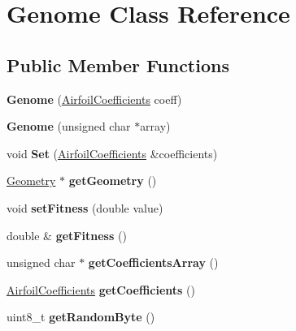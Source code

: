 \hypertarget{class_genome}{}\section{Genome Class Reference}
\label{class_genome}
\subsection*{Public Member Functions}
\begin{DoxyCompactItemize}
\item 
\hypertarget{class_genome_a2a9830ff70a104defa32311a0df1b23b}{}\label{class_genome_a2a9830ff70a104defa32311a0df1b23b} 
{\bfseries Genome} (\hyperlink{struct_airfoil_coefficients}{Airfoil\+Coefficients} coeff)
\item 
\hypertarget{class_genome_a010985b266e041f3c96174aa0e90f8fc}{}\label{class_genome_a010985b266e041f3c96174aa0e90f8fc} 
{\bfseries Genome} (unsigned char $\ast$array)
\item 
\hypertarget{class_genome_a0604b3988e6fd685f0eaffc124aed0c9}{}\label{class_genome_a0604b3988e6fd685f0eaffc124aed0c9} 
void {\bfseries Set} (\hyperlink{struct_airfoil_coefficients}{Airfoil\+Coefficients} \&coefficients)
\item 
\hypertarget{class_genome_a80747aa266026e16dfdaf1449ba5c8aa}{}\label{class_genome_a80747aa266026e16dfdaf1449ba5c8aa} 
\hyperlink{class_geometry}{Geometry} $\ast$ {\bfseries get\+Geometry} ()
\item 
\hypertarget{class_genome_a8ebe6f37306c3aa87a8d711ec778609f}{}\label{class_genome_a8ebe6f37306c3aa87a8d711ec778609f} 
void {\bfseries set\+Fitness} (double value)
\item 
\hypertarget{class_genome_a3b61a1cd0050ad1297867a0fc42736a6}{}\label{class_genome_a3b61a1cd0050ad1297867a0fc42736a6} 
double \& {\bfseries get\+Fitness} ()
\item 
\hypertarget{class_genome_a10f096f993bdecc320aebbd2ec867305}{}\label{class_genome_a10f096f993bdecc320aebbd2ec867305} 
unsigned char $\ast$ {\bfseries get\+Coefficients\+Array} ()
\item 
\hypertarget{class_genome_ac12d4227a6f8c923c7f65d760cdeac35}{}\label{class_genome_ac12d4227a6f8c923c7f65d760cdeac35} 
\hyperlink{struct_airfoil_coefficients}{Airfoil\+Coefficients} {\bfseries get\+Coefficients} ()
\item 
\hypertarget{class_genome_a8599bccee27d2594b0364f011cfe4b3f}{}\label{class_genome_a8599bccee27d2594b0364f011cfe4b3f} 
uint8\+\_\+t {\bfseries get\+Random\+Byte} ()

\end{DoxyCompactItemize}
